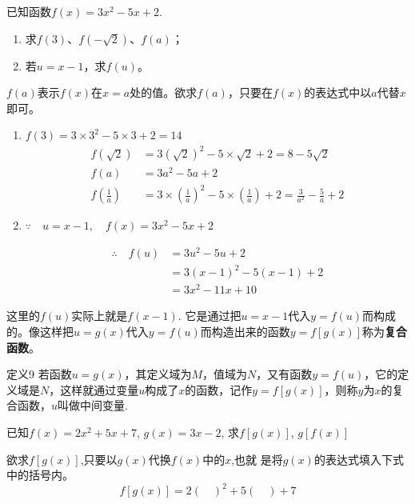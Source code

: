 已知函数$f(x)=3x^2-5x+2$.
\begin{enumerate}[(1)]
\item 求$f(3)$、$f(-\sqrt{2})$、$f(a)$；
\item 若$u=x-1$，求$f(u)$。   
\end{enumerate}

\begin{analyze}
    $f(a)$表示$f(x)$在$x=a$处的值。欲求$f(a)$，只要在$f(x)$的表达式中以$a$代替$x$即可。
\end{analyze}

\begin{solution}
\begin{enumerate}[(1)]
    \item $f(3)=3\times 3^2-5\times 3+2=14$
\[\begin{split}
    f(\sqrt{2})&=3\left(\sqrt{2}\right)^2-5\times \sqrt{2}+2=8-5\sqrt{2}\\
    f(a)&=3a^2-5a+2\\
    f\left(\frac{1}{a}\right)&=3\times \left(\frac{1}{a}\right)^2-5\times \left(\frac{1}{a}\right)+2=\frac{3}{a^2}-\frac{5}{a}+2
\end{split}\]
\item $\because\quad u=x-1,\quad f(x)=3x^2-5x+2$

\[\begin{split}
    \therefore\quad f(u)&=3u^2-5u+2\\
    &=3(x-1)^2-5(x-1)+2\\
    &=3x^2-11x+10
\end{split}\]
\end{enumerate}
\end{solution}

\begin{rmk}
这里的$f(u)$实际上就是$f(x-1)$. 它是通过把$u=x-1$代入$y=f(u)$而构成的。像这样把$u=g(x)$代入$y=f(u)$而构造出来的函数$y=f[g(x)]$称为\textbf{复合函数}。
\end{rmk}

\begin{thm} {定义9}
   若函数$u=g(x)$，其定义域为$M$，值域为$N$，又有函数$y=f(u)$，它的定义域是$N$，这样就通过变量$u$构成了$x$的函数，记作$y=f[g(x)]$，则称$y$为$x$的复合函数，$u$叫做中间变量.
\end{thm}

\begin{example}
    已知$f(x)=2x^{2}+5x+7$, $g(x)=3x-2$, 
求$f[g(x)]$, $g[f(x)]$
\end{example}

\begin{analyze}
欲求$f[g(x)]$,只要以$g(x)$代换$f(x)$中的$x$,也就
是将$g(x)$的表达式填入下式中的括号内。
$$f[g(x)]=2(\quad)^{2}+5(\quad)+7$$    
\end{analyze}

